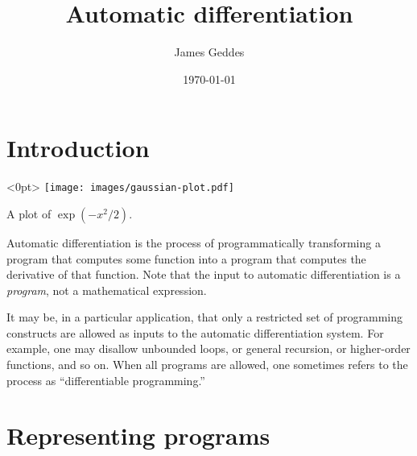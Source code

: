 \documentclass[11pt, a4paper]{article}
\title{Automatic differentiation}
\author{James Geddes}
\date{\today}
\begin{document}
\maketitle

\section{Introduction}


\begin{marginfigure}<0pt>
  \centering
  \texttt{[image: images/gaussian-plot.pdf]}
  \caption{A plot of $\exp(-x^2/2)$.\label{fig:gaussian-plot}}
\end{marginfigure}
Automatic differentiation is the process of programmatically
transforming a program that computes some function into a program that
computes the derivative of that function. Note that the input to
automatic differentiation is a \emph{program}, not a mathematical
expression.

It may be, in a particular application, that only a restricted set of
programming constructs are allowed as inputs to the automatic
differentiation system. For example, one may disallow unbounded loops,
or general recursion, or higher-order functions, and so on. When all
programs are allowed, one sometimes refers to the process as
``differentiable programming.''

\section{Representing programs}
\end{document}
